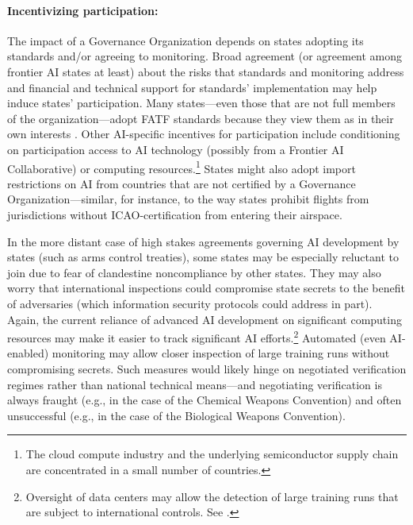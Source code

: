 \documentclass[12pt]{article}
\begin{document}
\paragraph{Incentivizing participation:} The impact of a Governance
Organization depends on states adopting its standards and/or agreeing to
monitoring. Broad agreement (or agreement among frontier AI states at
least) about the risks that standards and monitoring address and
financial and technical support for standards' implementation may help
induce states' participation. Many states---even those that are not full
members of the organization---adopt FATF standards because they view
them as in their own interests \cite{noauthor_memorandum_2008}.
Other AI-specific incentives for
participation include conditioning on participation access to AI
technology (possibly from a Frontier AI Collaborative) or computing
resources.\footnote{The cloud compute industry and the underlying
semiconductor supply chain are concentrated in a small number of
countries.} States might also adopt import restrictions on AI from
countries that are not certified by a Governance Organization---similar,
for instance, to the way states prohibit flights from jurisdictions
without ICAO-certification from entering their airspace.

In the more distant case of high stakes agreements governing AI
development by states (such as arms control treaties), some states may
be especially reluctant to join due to fear of clandestine noncompliance
by other states. They may also worry that international inspections
could compromise state secrets to the benefit of adversaries (which
information security protocols could address in part). Again, the
current reliance of advanced AI development on significant computing
resources may make it easier to track significant AI efforts.\footnote{Oversight 
of data centers may allow the detection
of large training runs that are subject to international controls. See \cite{shavit_what_2023, brundage_computing_nodate}.} Automated (even
AI-enabled) monitoring may allow closer inspection of large training
runs without compromising secrets. Such measures would likely hinge on
negotiated verification regimes rather than national technical
means---and negotiating verification is always fraught (e.g., in the
case of the Chemical Weapons Convention) and often unsuccessful (e.g.,
in the case of the Biological Weapons Convention)\cite{gallagher_politics_1999, jordan_international_nodate}.
\end{document}
